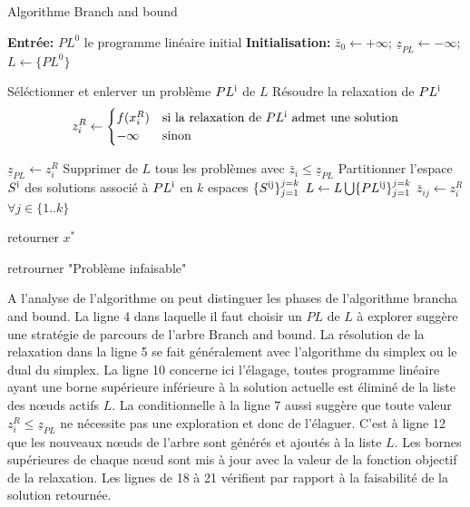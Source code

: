 \documentclass[12pt,a4paper,oneside]{book}
\theoremstyle{definition}
\begin{document}
	\begin{algorithm} \label{alg:bbpl}

		\caption{Algorithme Branch and bound}
		\SetAlgoLined
		\DontPrintSemicolon
		\textbf{Entrée:} $PL^0$ le programme linéaire initial \;
		\textbf{Initialisation:} $\bar{z}_0 \gets +\infty $; $\underline{z}_{PL} \gets -\infty$; $L \gets \{PL^0 \}$\;
		
		{
			Séléctionner et enlerver un problème $PL\textsuperscript{i}$ de $L$ \;
			Résoudre la relaxation de $PL\textsuperscript{i}$ \;
			\[ z_{i}^R \gets \begin{cases}
							f(x_{i}^R) & \text{si la relaxation de } PL\textsuperscript{i} \text{ admet une solution} \\
							-\infty & \text{sinon}
						\end{cases}\] \;
			{ 
				{
					$\underline{z}_{PL} \gets z_{i}^R$ \;
					Supprimer de $L$ tous les problèmes avec $\bar{z}_{i} \leq  \underline{z}_{PL} $\;
				}
				{
					Partitionner l'espace $S\textsuperscript{i}$ des solutions associé à $PL\textsuperscript{i}$ en $k$ espaces $\{S\textsuperscript{ij} \}_{j=1}^{j=k}$ \;
					$ L \gets L \bigcup \{PL\textsuperscript{ij} \}_{j=1}^{j=k}$ \;
					$\bar{z}_{ij} \gets z_i^R$ \hspace{10pt} $ \forall j \in \{1..k\} $ \;
				}
				
			}
		
		}
		{
			retourner $x^*$ \; 
			
		}
		{
			retrourner "Problème infaisable" \;
		}
	\end{algorithm}
	A l'analyse de l'algorithme on peut distinguer les phases de l'algorithme brancha and bound. La ligne 4 dans laquelle il faut choisir un $PL$ de $L$ à explorer suggère une stratégie de parcours de l'arbre Branch and bound.
	La résolution de la relaxation dans la ligne 5 se fait généralement avec l'algorithme du simplex ou le dual du simplex.
	La ligne 10 concerne ici l'élagage, toutes programme linéaire ayant une borne supérieure inférieure à la solution actuelle est éliminé de la liste des nœuds actifs $L$. La conditionnelle à la ligne 7 aussi suggère que toute valeur $z_{i}^R \leq \underline{z}_{PL}$ ne nécessite pas une exploration et donc de l'élaguer.
	C'est à ligne 12 que les nouveaux nœuds de l'arbre sont générés et ajoutés à la liste $L$. Les bornes supérieures de chaque nœud sont mis à jour avec la valeur de la fonction objectif de la relaxation. Les lignes de 18 à 21 vérifient par rapport à la faisabilité de la solution retournée.
	
\end{document}
